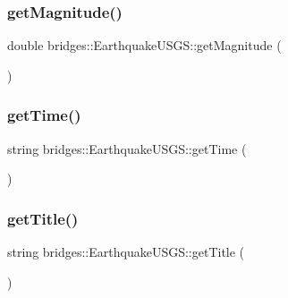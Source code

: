 \subsubsection{\texorpdfstring{get\+Magnitude()}{getMagnitude()}}
{\footnotesize\ttfamily double bridges\+::\+Earthquake\+U\+S\+G\+S\+::get\+Magnitude (\begin{DoxyParamCaption}{ }\end{DoxyParamCaption})\hspace{0.3cm}{\ttfamily [inline]}}

\hypertarget{classbridges_1_1_earthquake_u_s_g_s_a8d142b4ea194c5d839015ee7850a12c6}{}\label{classbridges_1_1_earthquake_u_s_g_s_a8d142b4ea194c5d839015ee7850a12c6} 
\subsubsection{\texorpdfstring{get\+Time()}{getTime()}}
{\footnotesize\ttfamily string bridges\+::\+Earthquake\+U\+S\+G\+S\+::get\+Time (\begin{DoxyParamCaption}{ }\end{DoxyParamCaption})\hspace{0.3cm}{\ttfamily [inline]}}

\hypertarget{classbridges_1_1_earthquake_u_s_g_s_a6b8e10f1a092c8884428cecbd1defb19}{}\label{classbridges_1_1_earthquake_u_s_g_s_a6b8e10f1a092c8884428cecbd1defb19} 
\subsubsection{\texorpdfstring{get\+Title()}{getTitle()}}
{\footnotesize\ttfamily string bridges\+::\+Earthquake\+U\+S\+G\+S\+::get\+Title (\begin{DoxyParamCaption}{ }\end{DoxyParamCaption})\hspace{0.3cm}{\ttfamily [inline]}}

\hypertarget{classbridges_1_1_earthquake_u_s_g_s_a60961cae033becb6144c883a7a984f86}{}\label{classbridges_1_1_earthquake_u_s_g_s_a60961cae033becb6144c883a7a984f86} 
